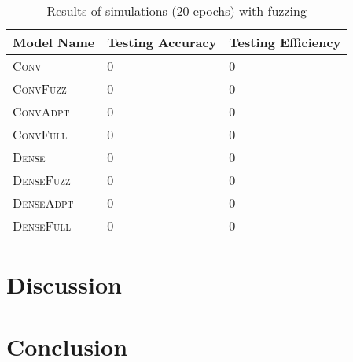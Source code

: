 \documentclass{article}
\begin{document}
\begin{table}[h]
  \caption{Results of simulations (20 epochs) with fuzzing}
  \label{tbl:results4}
  \centering
  \begin{tabular}{lll}
    \toprule
    Model Name & Testing Accuracy & Testing Efficiency \\
    \midrule
    \textsc{Conv}         & 0 & 0 \\
    \textsc{ConvFuzz}     & 0 & 0 \\
    \textsc{ConvAdpt}     & 0 & 0 \\
    \textsc{ConvFull}     & 0 & 0 \\
    \textsc{Dense}        & 0 & 0 \\
    \textsc{DenseFuzz}    & 0 & 0 \\
    \textsc{DenseAdpt}    & 0 & 0 \\
    \textsc{DenseFull}    & 0 & 0 \\
    \bottomrule
  \end{tabular}
\end{table}

\section{Discussion}

\section{Conclusion}


\end{document}
